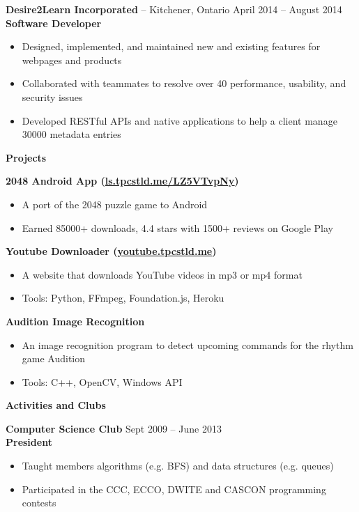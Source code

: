 \documentclass{letter}
\begin{document}
\vspace{-1.5mm}
{\bfseries Desire2Learn Incorporated} -- Kitchener, Ontario \hfill April 2014 -- August 2014 \\
{\bfseries Software Developer}
\vspace{-3mm}
\begin{itemize}
    \item Designed, implemented, and maintained new and existing features for webpages and products
    \item Collaborated with teammates to resolve over 40 performance, usability, and security issues
    \item Developed RESTful APIs and native applications to help a client manage 30000 metadata entries
\end{itemize}

{\bfseries \Large Projects}

\vspace{-1.5mm}
{\bfseries 2048 Android App (\href{http://ls.tpcstld.me/LZ5YTvpNy}{\uline{ls.tpcstld.me/LZ5VTvpNy}})}
\vspace{-3mm}
\begin{itemize}
    \item A port of the 2048 puzzle game to Android
    \item Earned 85000+ downloads, 4.4 stars with 1500+ reviews on Google Play
\end{itemize}
\vspace{-3mm}
{\bfseries Youtube Downloader (\href{http://youtube.tpcstld.me}{\uline{youtube.tpcstld.me}})}
\vspace{-3mm}
\begin{itemize}
    \item A website that downloads YouTube videos in mp3 or mp4 format
    \item Tools: Python, FFmpeg, Foundation.js, Heroku
\end{itemize}
\vspace{-3mm}
{\bfseries Audition Image Recognition}
\vspace{-3mm}
\begin{itemize}
    \item An image recognition program to detect upcoming commands for the rhythm game Audition
    \item Tools: C++, OpenCV, Windows API
\end{itemize}

{\bfseries \Large Activities and Clubs}

\vspace{-1.5mm}
{\bfseries Computer Science Club} \hfill Sept 2009 -- June 2013 \\
{\bfseries President}
\vspace{-3mm}
\begin{itemize}
  \item Taught members algorithms (e.g. BFS) and data structures (e.g. queues)
  \item Participated in the CCC, ECCO, DWITE and CASCON programming contests
\end{itemize}
\end{document}
